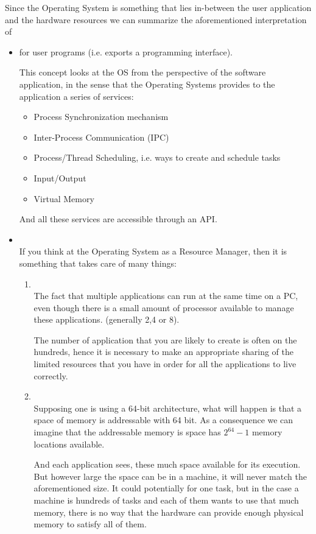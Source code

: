 Since the Operating System is something that lies in-between the user application and the hardware resources we can summarize the aforementioned interpretation of 
\begin{itemize}
    \item {} for user programs (i.e. exports a programming interface).
    
    This concept looks at the OS from the perspective of the software application, in the sense that the Operating Systems provides to the application a series of services:
        \begin{itemize}
        \item Process Synchronization mechanism
        \item Inter-Process Communication (IPC)
        \item Process/Thread Scheduling, i.e.  ways to create and schedule tasks
        \item Input/Output
        \item Virtual Memory
        \end{itemize}
    And all these services are accessible through an API.


    \item {}\\
    If you think at the Operating System as a Resource Manager, then it is something that takes care of many things:
    \begin{enumerate}
        \item {}\\
        The fact that multiple applications can run at the same time on a PC, even though there is a small amount of processor available to manage these applications. (generally 2,4 or 8).
        
        The number of application that you are likely to create is often on the hundreds, hence it is necessary to make an appropriate sharing of the limited resources that you have in order for all the applications to live correctly.
        \item {}\\
        Supposing one is using a 64-bit architecture, what will happen is that a space of memory is addressable with 64 bit. As a consequence we can imagine that the addressable memory is space has $2^{64} - 1$ memory locations available.
        
        And each application sees, these much space available for its execution. But however large the space can be in a machine, it will never match the aforementioned size. It could potentially for one task, but in the case a machine is hundreds of tasks and each of them wants to use that much memory, there is no way that the hardware can provide enough physical memory to satisfy all of them.
        

\end{enumerate}
\end{itemize}

